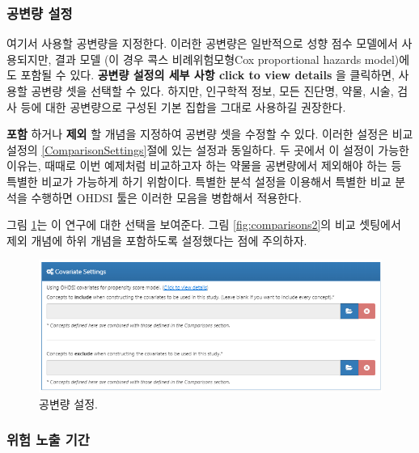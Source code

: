 \documentclass[10.5pt]{book}
\theoremstyle{definition}
\theoremstyle{definition}
\theoremstyle{definition}
\theoremstyle{remark}
\begin{document}
\subsubsection*{공변량 설정}\label{-}

여기서 사용할 공변량을 지정한다. 이러한 공변량은 일반적으로 성향 점수
모델에서 사용되지만, 결과 모델 (이 경우 콕스 비례위험모형Cox
proportional hazards model)에도 포함될 수 있다. \textbf{공변량 설정의
세부 사항 click to view details} 을 클릭하면, 사용할 공변량 셋을 선택할
수 있다. 하지만, 인구학적 정보, 모든 진단명, 약물, 시술, 검사 등에 대한
공변량으로 구성된 기본 집합을 그대로 사용하길 권장한다.

\textbf{포함} 하거나 \textbf{제외} 할 개념을 지정하여 공변량 셋을 수정할
수 있다. 이러한 설정은 비교 설정의 \ref{ComparisonSettings}절에 있는
설정과 동일하다. 두 곳에서 이 설정이 가능한 이유는, 때때로 이번 예제처럼
비교하고자 하는 약물을 공변량에서 제외해야 하는 등 특별한 비교가
가능하게 하기 위함이다. 특별한 분석 설정을 이용해서 특별한 비교 분석을
수행하면 OHDSI 툴은 이러한 모음을 병합해서 적용한다.

그림 \ref{fig:covariateSettings}는 이 연구에 대한 선택을 보여준다. 그림
\ref{fig:comparisons2}의 비교 셋팅에서 제외 개념에 하위 개념을
포함하도록 설정했다는 점에 주의하자.

\begin{figure}

{\centering \includegraphics[width=1\linewidth]{images/PopulationLevelEstimation/covariateSettings} 

}

\caption{공변량 설정.}\label{fig:covariateSettings}
\end{figure}

\subsubsection*{위험 노출 기간}\label{--}
\end{document}
